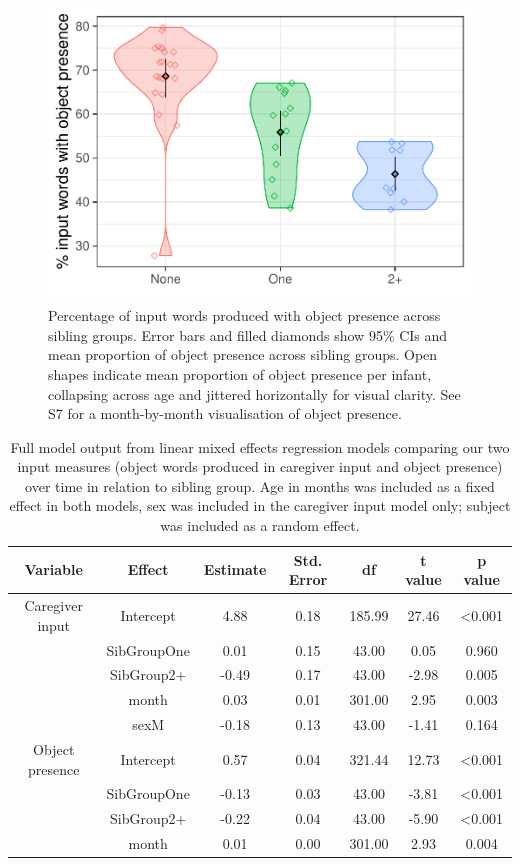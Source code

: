 \documentclass[
  man,floatsintext]{apa6}
\begin{document}
\begin{figure}
\centering
\includegraphics{SiblingsStudyText-final_files/figure-latex/Figure-object-presence-1.pdf}
\caption{\label{fig:Figure-object-presence}Percentage of input words produced with object presence across sibling groups. Error bars and filled diamonds show 95\% CIs and mean proportion of object presence across sibling groups. Open shapes indicate mean proportion of object presence per infant, collapsing across age and jittered horizontally for visual clarity. See S7 for a month-by-month visualisation of object presence.}
\end{figure}

\begin{longtable}[t]{ccccccc}
\caption{\label{tab:table-input-model-summary}Full model output from linear mixed effects regression models comparing our two input measures (object words produced in caregiver input and object presence) over time in relation to sibling group. Age in months was included as a fixed effect in both models, sex was included in the caregiver input model only; subject was included as a random effect.}\\
\toprule
Variable & Effect & Estimate & Std. Error & df & t value & p value\\
\midrule
Caregiver input & Intercept & 4.88 & 0.18 & 185.99 & 27.46 & <0.001\\
 & SibGroupOne & 0.01 & 0.15 & 43.00 & 0.05 & 0.960\\
 & SibGroup2+ & -0.49 & 0.17 & 43.00 & -2.98 & 0.005\\
 & month & 0.03 & 0.01 & 301.00 & 2.95 & 0.003\\
 & sexM & -0.18 & 0.13 & 43.00 & -1.41 & 0.164\\
\midrule
\addlinespace
Object presence & Intercept & 0.57 & 0.04 & 321.44 & 12.73 & <0.001\\
 & SibGroupOne & -0.13 & 0.03 & 43.00 & -3.81 & <0.001\\
 & SibGroup2+ & -0.22 & 0.04 & 43.00 & -5.90 & <0.001\\
 & month & 0.01 & 0.00 & 301.00 & 2.93 & 0.004\\
\bottomrule
\end{longtable}
\end{document}
